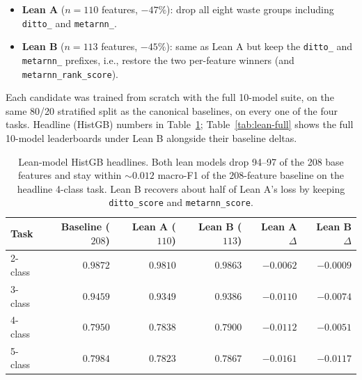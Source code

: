 \documentclass[11pt,a4paper]{article}
\begin{document}
\begin{itemize}[leftmargin=*]
    \item \textbf{Lean A} ($n=110$ features, $-47\%$): drop all eight
          waste groups including \texttt{ditto\_} and \texttt{metarnn\_}.
    \item \textbf{Lean B} ($n=113$ features, $-45\%$): same as Lean A
          but keep the \texttt{ditto\_} and \texttt{metarnn\_} prefixes,
          i.e., restore the two per-feature winners (and \texttt{metarnn\_rank\_score}).
\end{itemize}

Each candidate was trained from scratch with the full 10-model suite,
on the same 80/20 stratified split as the canonical baselines, on every
one of the four tasks. Headline (HistGB) numbers in
Table~\ref{tab:lean-headline}; Table~\ref{tab:lean-full} shows the full
10-model leaderboards under Lean B alongside their baseline deltas.

\begin{table}[H]
\centering
\caption{Lean-model HistGB headlines. Both lean models drop 94--97 of
the 208 base features and stay within $\sim 0.012$ macro-F1 of the
$208$-feature baseline on the headline 4-class task. Lean B recovers
about half of Lean A's loss by keeping \texttt{ditto\_score} and
\texttt{metarnn\_score}.}
\label{tab:lean-headline}
\small
\begin{tabular}{lrrrrr}
\toprule
Task & Baseline ($208$) & Lean A ($110$) & Lean B ($113$) & Lean A $\Delta$ & Lean B $\Delta$ \\
\midrule
2-class & $0.9872$ & $0.9810$ & $\mathbf{0.9863}$ & $-0.0062$ & $-0.0009$ \\
3-class & $0.9459$ & $0.9349$ & $\mathbf{0.9386}$ & $-0.0110$ & $-0.0074$ \\
4-class & $0.7950$ & $0.7838$ & $\mathbf{0.7900}$ & $-0.0112$ & $-0.0051$ \\
5-class & $0.7984$ & $0.7823$ & $\mathbf{0.7867}$ & $-0.0161$ & $-0.0117$ \\
\bottomrule
\end{tabular}
\end{table}
\end{document}
